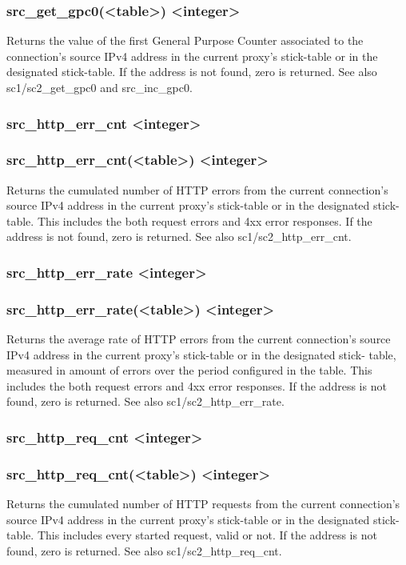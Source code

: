 \subsubsection*{src\_get\_gpc0(<table>) <integer>}
  Returns the value of the first General Purpose Counter associated to the
  connection's source IPv4 address in the current proxy's stick-table or in
  the designated stick-table. If the address is not found, zero is returned.
  See also sc1/sc2\_get\_gpc0 and src\_inc\_gpc0.

\subsubsection[src\_http\_err\_cnt]{src\_http\_err\_cnt <integer>}
\subsubsection*{src\_http\_err\_cnt(<table>) <integer>}
  Returns the cumulated number of HTTP errors from the current connection's
  source IPv4 address in the current proxy's stick-table or in the designated
  stick-table. This includes the both request errors and 4xx error responses.
  If the address is not found, zero is returned. See also sc1/sc2\_http\_err\_cnt.

\subsubsection[src\_http\_err\_rate]{src\_http\_err\_rate <integer>}
\subsubsection{src\_http\_err\_rate(<table>) <integer>}
  Returns the average rate of HTTP errors from the current connection's source
  IPv4 address in the current proxy's stick-table or in the designated stick-
  table, measured in amount of errors over the period configured in the table.
  This includes the both request errors and 4xx error responses. If the address
  is not found, zero is returned. See also sc1/sc2\_http\_err\_rate.

\subsubsection[src\_http\_req\_cnt]{src\_http\_req\_cnt <integer>}
\subsubsection*{src\_http\_req\_cnt(<table>) <integer>}
  Returns the cumulated number of HTTP requests from the current connection's
  source IPv4 address in the current proxy's stick-table or in the designated
  stick-table. This includes every started request, valid or not. If the
  address is not found, zero is returned. See also sc1/sc2\_http\_req\_cnt.

